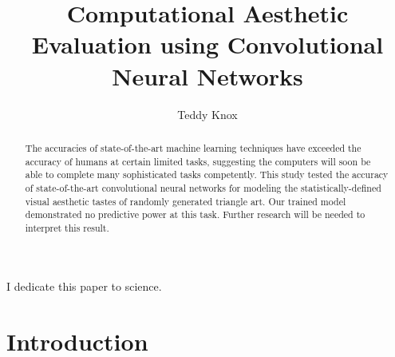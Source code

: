 \documentclass[midd]{thesis}
\title {Computational Aesthetic Evaluation using Convolutional Neural Networks}
\author {Teddy Knox}
\begin{document}
\maketitle

\begin{abstract}
The accuracies of state-of-the-art machine learning techniques have exceeded the accuracy of humans at certain limited tasks, suggesting the computers will soon be able to complete many sophisticated tasks competently. This study tested the accuracy of state-of-the-art convolutional neural networks for modeling the statistically-defined visual aesthetic tastes of randomly generated triangle art. Our trained model demonstrated no predictive power at this task. Further research will be needed to interpret this result.
\end{abstract}

\begin{acknowledgements}
I dedicate this paper to science.
\end{acknowledgements}

\contentspage
\tablelistpage
\figurelistpage

\normalspacing \setcounter{page}{1} 

\chapter{Introduction}
\label{sec:intro}
\end{document}
